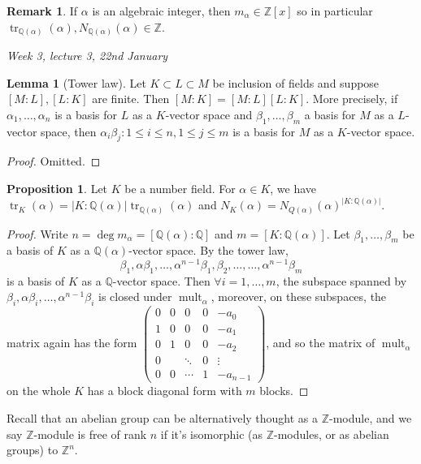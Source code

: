 \documentclass{article}
\newcommand{\Z}{\mathbb{Z}}
\newcommand{\Q}{\mathbb{Q}}
\newcommand{\tr}{\operatorname{tr}}
\newcommand{\mult}{\operatorname{mult}}
\theoremstyle{definition}
\newtheorem{prop}[defn]{Proposition}
\newtheorem{lemma}[defn]{Lemma}
\newtheorem{remark}[defn]{Remark}
\begin{document}
\begin{remark}
\label{remark:inthasinttrN}
If $\alpha$ is an algebraic integer, then $m_\alpha\in\Z[x]$ so in particular $\tr_{\Q(\alpha)}(\alpha),N_{\Q(\alpha)}(\alpha)\in\Z$.
\end{remark}

\begin{flushright}
\textit{Week 3, lecture 3, 22nd January}
\end{flushright}

\begin{lemma}[Tower law]
Let $K\subset L\subset M$ be inclusion of fields and suppose $[M:L],[L:K]$ are finite. Then $[M:K]=[M:L][L:K]$. More precisely, if $\alpha_1,\ldots,\alpha_n$ is a basis for $L$ as a $K$-vector space and $\beta_1,\ldots,\beta_m$ a basis for $M$ as a $L$-vector space, then $\alpha_i\beta_j:1\leq i\leq n,1\leq j\leq m$ is a basis for $M$ as a $K$-vector space.
\end{lemma}
\begin{proof}
Omitted.
\end{proof}

\begin{prop}
Let $K$ be a number field. For $\alpha\in K$, we have $\tr_K(\alpha)=|K:\Q(\alpha)|\tr_{\Q(\alpha)}(\alpha)$ and $N_K(\alpha)=N_{Q(\alpha)}(\alpha)^{|K:\Q(\alpha)|}$.
\end{prop}
\begin{proof}
Write $n=\deg m_\alpha=[\Q(\alpha):\Q]$ and $m=[K:\Q(\alpha)]$. Let $\beta_1,\ldots,\beta_m$ be a basis of $K$ as a $\Q(\alpha)$-vector space. By the tower law,
\[
\beta_1,\alpha\beta_1,\ldots,\alpha^{n-1}\beta_1,\beta_2,\ldots,\ldots,\alpha^{n-1}\beta_m
\]
is a basis of $K$ as a $\Q$-vector space. Then $\forall i=1,\ldots,m$, the subspace spanned by $\beta_i,\alpha\beta_i,\ldots,\alpha^{n-1}\beta_i$ is closed under $\mult_\alpha$, moreover, on these subspaces, the matrix again has the form $\begin{pmatrix}
0 & 0 & 0 & 0 & -a_0 \\
1 & 0 & 0 & 0 & -a_1\\
0 & 1 & 0 & 0 & -a_2\\
0 & & \ddots & 0 & \vdots \\
0 & 0 & \cdots & 1 & -a_{n-1}
\end{pmatrix}$, and so the matrix of $\mult_\alpha$ on the whole $K$ has a block diagonal form with $m$ blocks.
\end{proof}

Recall that an abelian group can be alternatively thought as a $\Z$-module, and we say $\Z$-module is free of rank $n$ if it's isomorphic (as $\Z$-modules, or as abelian groups) to $\Z^n$.
\end{document}
